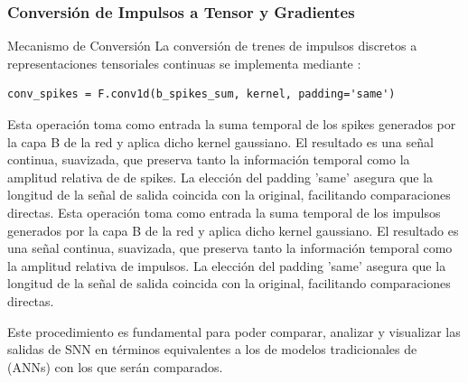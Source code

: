 \subsubsection {Conversión de Impulsos a Tensor y Gradientes}
Mecanismo de Conversión
La conversión de trenes de impulsos discretos a representaciones tensoriales continuas se implementa mediante :

\begin{verbatim}
conv_spikes = F.conv1d(b_spikes_sum, kernel, padding='same')
\end{verbatim}

Esta operación toma como entrada la suma temporal de los spikes generados por la capa B de la red y aplica dicho kernel gaussiano. El resultado es una señal continua, suavizada, que preserva tanto la información temporal como la amplitud relativa de de spikes. La elección del padding 'same' asegura que la longitud de la señal de salida coincida con la original, facilitando comparaciones directas.
Esta operación toma como entrada la suma temporal de los impulsos generados por la capa B de la red y aplica dicho kernel gaussiano. El resultado es una señal continua, suavizada, que preserva tanto la información temporal como la amplitud relativa de impulsos. La elección del padding 'same' asegura que la longitud de la señal de salida coincida con la original, facilitando comparaciones directas.

Este procedimiento es fundamental para poder comparar, analizar y visualizar las salidas de SNN en términos equivalentes a los de modelos tradicionales de (ANNs) con los que serán comparados.

    
    
    

